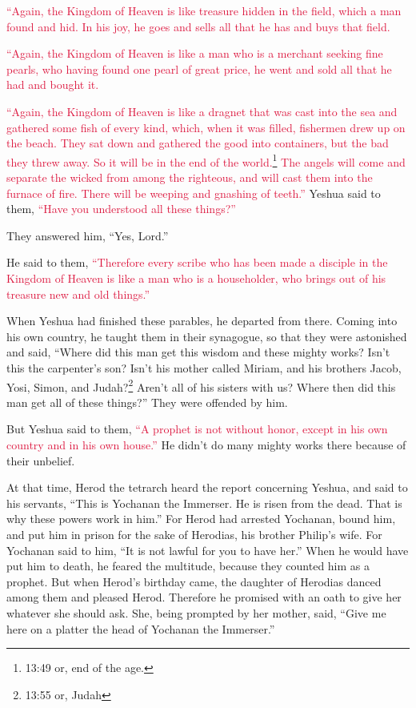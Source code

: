 \myverse{}\textcolor{crimson}{“Again, the Kingdom of Heaven is like treasure hidden in
	the field, which a man found and hid. In his joy, he goes and sells all that he has and buys that field.}

\myverse{}\textcolor{crimson}{“Again, the Kingdom of Heaven is like a man who is a merchant
	seeking fine pearls,
}
\myverse{}\textcolor{crimson}{who having found one pearl of great price, he went and sold all that
	he had and bought it.}

\myverse{}\textcolor{crimson}{“Again, the Kingdom of Heaven is like a dragnet that was
	cast into the sea and gathered some fish of every kind,
}
\myverse{}\textcolor{crimson}{which, when it was filled, fishermen drew up on the beach. They sat down
	and gathered the good into containers, but the bad they threw away.
}
\myverse{}\textcolor{crimson}{So it will be in the end of the world.}\footnote{13:49 or, end of the age.}
\textcolor{crimson}{The angels will come and separate the wicked from among the righteous,
}
\myverse{}\textcolor{crimson}{and will cast them into the furnace of fire. There will be weeping and
	gnashing of teeth.”}
\myverse{}Yeshua said to them,
\textcolor{crimson}{“Have you understood all these things?”
}

They answered him, “Yes, Lord.”

\myverse{}He said to them,
\textcolor{crimson}{“Therefore every scribe who has been made a disciple in the Kingdom of Heaven is like a man who is
	a householder, who brings out of his treasure new and old things.”}

\myverse{}When Yeshua had finished these parables, he departed from there.
\myverse{}Coming into his own country, he taught them in their synagogue, so that they
were astonished and said, “Where did this man get this wisdom and these mighty works?
\myverse{}Isn’t this the carpenter’s son? Isn’t his mother called Miriam, and his brothers
Jacob, Yosi, Simon, and Judah?\footnote{13:55 or, Judah}
\myverse{}Aren’t all of his sisters with us? Where then did this man get all of these
things?”
\myverse{}They were offended by him.

But Yeshua said to them,
\textcolor{crimson}{“A prophet is not without honor, except in his own country and in his own house.”}
\myverse{}He didn’t do many mighty works there because of their unbelief.


\mychapter{} \myverse*{}At that time, Herod the tetrarch heard the report concerning Yeshua,
\myverse{}and said to his servants, “This is Yochanan the Immerser. He is risen from
the dead. That is why these powers work in him.”
\myverse{}For Herod had arrested Yochanan, bound him, and put him in prison for the sake
of Herodias, his brother Philip’s wife.
\myverse{}For Yochanan said to him, “It is not lawful for you to have her.”
\myverse{}When he would have put him to death, he feared the multitude, because they
counted him as a prophet.
\myverse{}But when Herod’s birthday came, the daughter of Herodias danced among them
and pleased Herod.
\myverse{}Therefore he promised with an oath to give her whatever she should ask.
\myverse{}She, being prompted by her mother, said, “Give me here on a platter the head
of Yochanan the Immerser.”

